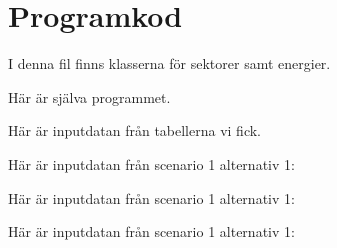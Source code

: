 \documentclass[a4paper,11pt,fleqn, titlepage]{article}
\begin{document}
\newpage
\section{Programkod}                                                                 
I denna fil finns klasserna för sektorer samt energier.                              
                                 
                                                                                     
\newpage                                                                             
Här är själva programmet.                                                            
                                   
                                                                                     
\newpage                                                                             
Här är inputdatan från tabellerna vi fick.                                             
  

Här är inputdatan från scenario 1 alternativ 1:
  

Här är inputdatan från scenario 1 alternativ 1:
  

Här är inputdatan från scenario 1 alternativ 1:
  
\end{document}
